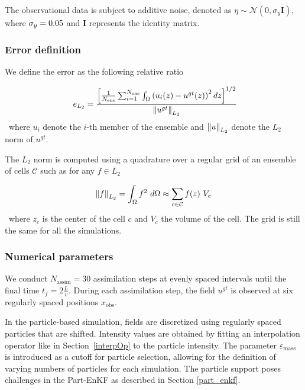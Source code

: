 The observational data is subject to additive noise, denoted as $\eta \sim \mathcal{N}(0, \sigma_y \bm{I})$, where $\sigma_y = 0.05$ and $\bm{I}$ represents the identity matrix.

\subsubsection{Error definition}
We define the error as the following relative ratio

\begin{equation}~\label{eq:L2_error}
	e_{L_2} =\frac{ \left[\frac1{N_{\text{ens}}} \sum_{i = 1}^{N_{\text{ens}}} \int_\Omega \left(u_i(z) - u^{gt}(z)\right)^2 dz\right]^{1/2}}{\left\lVert u^{gt} \right\rVert_{L_2}}
\end{equation}~where $u_i$ denote the $i$-th member of the ensemble and $\left\lVert u \right\rVert_{L_2}$ denote the $L_2$ norm of $u^{gt}$.

The $L_2$ norm is computed using a quadrature over a regular grid of an ensemble of cells $\mathcal{C}$ such as for any $f \in L_2$

$$
	\left\lVert f \right\rVert_{L_2}  = \int_{\Omega} f^2~d\Omega \approx \sum_{c \in \mathcal{C}} f(z)~V_c
$$~where $z_c$ is the center of the cell $c$ and $V_c$ the volume of the cell. The grid is still the same for all the simulations.

\subsubsection{Numerical parameters}

We conduct $N_{\text{assim}} = 30$ assimilation steps at evenly spaced intervals until the final time $t_f = 2 \frac{L}{v}$. During each assimilation step, the field $u^{gt}$ is observed at six regularly spaced positions $x_{\text{obs}}$.


In the particle-based simulation, fields are discretized using regularly spaced particles that are shifted. Intensity values are obtained by fitting an interpolation operator like in Section~\ref{interpOp} to the particle intensity.
The parameter $\varepsilon_{\text{mass}}$ is introduced as a cutoff for particle selection, allowing for the definition of varying numbers of particles for each simulation. The particle support poses challenges in the Part-EnKF as described in Section \ref{part_enkf}.

